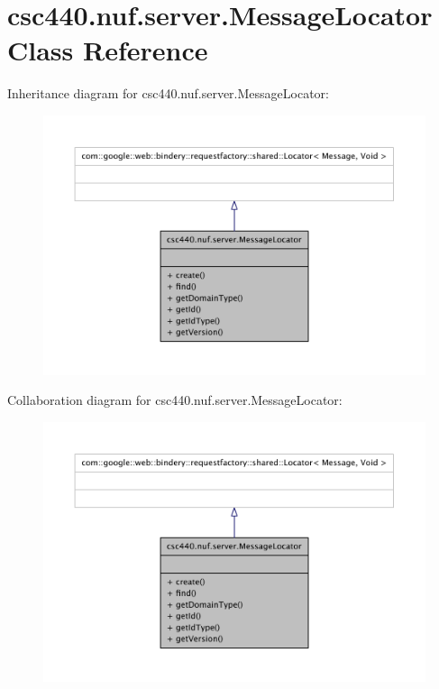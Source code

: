 \hypertarget{classcsc440_1_1nuf_1_1server_1_1_message_locator}{\section{csc440.\-nuf.\-server.\-Message\-Locator Class Reference}
\label{classcsc440_1_1nuf_1_1server_1_1_message_locator}
}


Inheritance diagram for csc440.\-nuf.\-server.\-Message\-Locator\-:
\nopagebreak
\begin{figure}[H]
\begin{center}
\leavevmode
\includegraphics[width=350pt]{classcsc440_1_1nuf_1_1server_1_1_message_locator__inherit__graph}
\end{center}
\end{figure}


Collaboration diagram for csc440.\-nuf.\-server.\-Message\-Locator\-:
\nopagebreak
\begin{figure}[H]
\begin{center}
\leavevmode
\includegraphics[width=350pt]{classcsc440_1_1nuf_1_1server_1_1_message_locator__coll__graph}
\end{center}
\end{figure}
